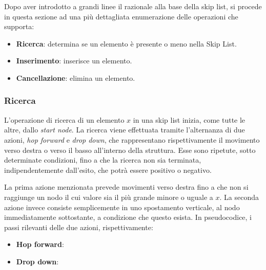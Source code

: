 		Dopo aver introdotto a grandi linee il razionale alla base della skip list, si procede in questa sezione ad una più dettagliata enumerazione delle operazioni che supporta:
		\begin{itemize} 
			\item \textbf{Ricerca}: determina se un elemento è presente o meno nella Skip List.
			\item \textbf{Inserimento}: inserisce un elemento.
			\item \textbf{Cancellazione}: elimina un elemento.
		\end{itemize} 
	
		\subsubsection{Ricerca}
			
			L'operazione di ricerca di un elemento $ x $ in una skip list inizia, come tutte le altre, dallo \textit{start node}. La ricerca viene effettuata tramite l'alternanza di due azioni, \textit{hop forward} e \textit{drop down}, che rappresentano rispettivamente il movimento verso destra o verso il basso all'interno della struttura. Esse sono ripetute, sotto determinate condizioni, fino a che la ricerca non sia terminata, indipendentemente dall'esito, che potrà essere positivo o negativo.
			
			La prima azione menzionata prevede movimenti verso destra fino a che non si raggiunge un nodo il cui valore sia il più grande minore o uguale a $ x $. La seconda azione invece consiste semplicemente in uno spostamento verticale, al nodo immediatamente sottostante, a condizione che questo esista.  In pseudocodice, i passi rilevanti delle due azioni, rispettivamente: 
			
			\begin{itemize}
			
			\item \textbf{Hop forward}:
				\begin{algorithm}[H]
				\end{algorithm}
			
			\item \textbf{Drop down}:
				\begin{algorithm}[H]
				\end{algorithm}
			\end{itemize} 
			
